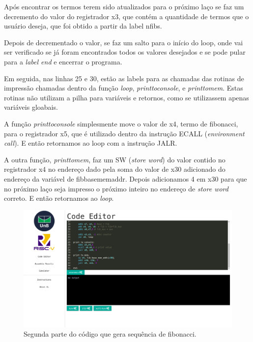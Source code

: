 	Após encontrar os termos terem sido atualizados para o próximo laço se faz um decremento do valor do registrador x3, que contém a quantidade de termos que o usuário deseja, que foi obtido a partir da label n\textunderscore fibs.

	Depois de decrementado o valor, se faz um salto para o início do loop, onde vai ser verificado se já foram encontrados todos os valores desejados e se pode pular para a \textit{label end} e encerrar o programa. 

	Em seguida, nas linhas 25 e 30, estão as labels para as chamadas das rotinas de impressão chamadas dentro da função \textit{loop}, \textit{print\textunderscore to\textunderscore console}, e \textit{print\textunderscore to\textunderscore mem}. Estas rotinas não utilizam a pilha para variáveis e retornos, como se utilizassem apenas variáveis gloabais.

	A função \textit{print\textunderscore to\textunderscore console} simplesmente move o valor de x4, termo de fibonacci, para o registrador x5, que é utilizado dentro da instrução ECALL (\textit{environment call}). E então retornamos ao loop com a instrução JALR.

	A outra função, \textit{print\textunderscore to\textunderscore mem}, faz um SW (\textit{store word}) do valor contido no registrador x4 no endereço dado pela soma do valor de x30 adicionado do endereço da variável de fib\textunderscore base\textunderscore mem\textunderscore addr. Depois adicionamos 4 em x30 para que no próximo laço seja impresso o próximo inteiro no endereço de \textit{store word} correto. E então retornamos ao \textit{loop}.

	\begin{figure}[h]
	  \centering
	  \includegraphics[width=14cm]{img/fibonacci_codigo_2.png}
	  \caption{Segunda parte do código que gera sequência de fibonacci.}
	  \label{fig:fib-codigo-2}
	\end{figure}


